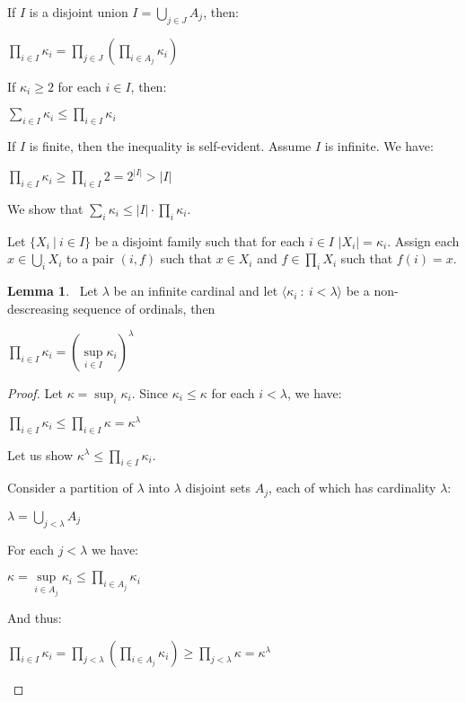\documentclass[8pt]{article}
\theoremstyle{definition}
\theoremstyle{definition}
\theoremstyle{definition}
\theoremstyle{definition}
\theoremstyle{definition}
\theoremstyle{definition}
\theoremstyle{definition}
\theoremstyle{definition}
\newtheorem{lemma}{Lemma}[section]
\theoremstyle{definition}
\theoremstyle{definition}
\theoremstyle{definition}
\theoremstyle{definition}
\theoremstyle{definition}
\theoremstyle{definition}
\theoremstyle{question}
\begin{document}
If $I$ is a disjoint union $I = \bigcup \limits_{j \in J} A_j$, then:
\begin{center}
  $\prod \limits_{i \in I} \kappa_i = \prod \limits_{j \in J} (\prod \limits_{i \in A_j} \kappa_i)$
\end{center}

If $\kappa_i \geq 2$ for each $i \in I$, then:
\begin{center}
  $\sum \limits_{i \in I} \kappa_i \leq \prod \limits_{i \in I} \kappa_i$
\end{center}
If $I$ is finite, then the inequality is self-evident. Assume $I$ is infinite. We have:
\begin{center}
  $\prod \limits_{i \in I} \kappa_i \geq \prod \limits_{i \in I} 2 = 2^{|I|} > |I|$
\end{center}
We show that $\sum_i \kappa_i \leq |I| \cdot \prod_i \kappa_i$.

Let $\{ X_i \: | \: i \in I \}$ be a disjoint family such that for each $i \in I$ $|X_i| = \kappa_i$.
Assign each $x \in \bigcup_i X_i$ to a pair $(i, f)$ such that $x \in X_i$ and $f \in \prod_i X_i$
such that $f(i) = x$.

\begin{lemma}~\label{prod:as:sup}
  Let $\lambda$ be an infinite cardinal and let $\langle \kappa_i \: : \: i < \lambda \rangle$ 
  be a non-descreasing sequence of ordinals, then
  \begin{center}
    $\prod \limits_{i \in I} \kappa_i = (\sup \limits_{i \in I} \kappa_i)^{\lambda}$
  \end{center}
\end{lemma}
\begin{proof}
  Let $\kappa = \sup_i \kappa_i$. Since $\kappa_i \leq \kappa$ for each $i < \lambda$, we have:
  \begin{center}
    $\prod \limits_{i \in I} \kappa_i \leq \prod \limits_{i \in I} \kappa = \kappa^{\lambda}$
  \end{center}
  Let us show $\kappa^{\lambda} \leq \prod \limits_{i \in I} \kappa_i$.

  Consider a partition of $\lambda$ into $\lambda$ disjoint sets $A_j$, each of which has cardinality $\lambda$:
  \begin{center}
    $\lambda = \bigcup \limits_{j < \lambda} A_j$
  \end{center}

  For each $j < \lambda$ we have:
  \begin{center}
    $\kappa = \sup \limits_{i \in A_j} \kappa_i \leq \prod \limits_{i \in A_j} \kappa_i$
  \end{center}
  And thus:
  \begin{center}
    $\prod \limits_{i \in I} \kappa_i = \prod \limits_{j < \lambda} (\prod \limits_{i \in A_j} \kappa_i) \geq \prod \limits_{j < \lambda} \kappa = \kappa^{\lambda}$
  \end{center}
\end{proof}
\end{document}
